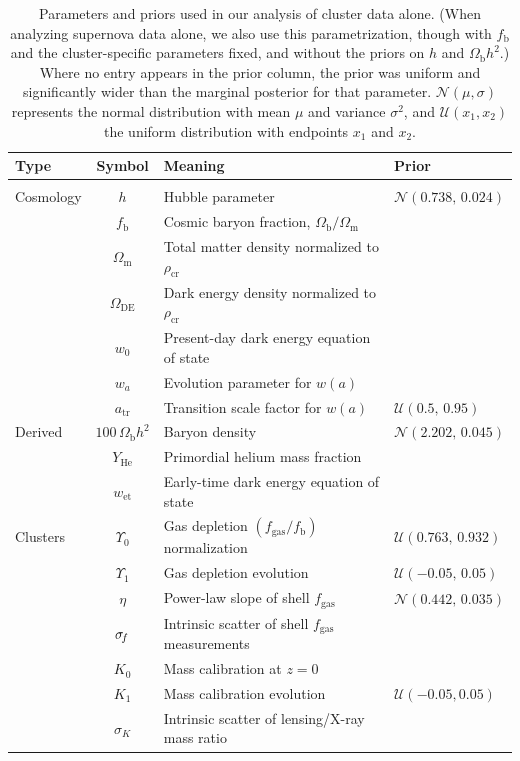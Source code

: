 \documentclass[useAMS,usenatbib,usegraphicx]{mn2e}
\newcommand*{\mysub}[2]{\ensuremath{#1_{\mathrm{#2}}}}
\newcommand*{\Omegam}{\mysub{\Omega}{m}}
\newcommand*{\Omegab}{\mysub{\Omega}{b}}
\newcommand*{\Omegade}{\mysub{\Omega}{DE}}
\newcommand*{\fbar}{\mysub{f}{b}}
\newcommand*{\fgas}{\mysub{f}{gas}}
\newcommand*{\sigmaf}{\ensuremath{\sigma_{\hspace{-0.25ex}f}}}
\newcommand*{\rhocr}{\mysub{\rho}{cr}}
\newcommand*{\YHe}{\mysub{Y}{He}}
\newcommand*{\atr}{\mysub{a}{tr}}
\newcommand*{\wet}{\mysub{w}{et}}
\newcommand*{\dnorm}{\ensuremath{\mathcal{N}}}
\newcommand*{\dunif}{\ensuremath{\mathcal{U}}}
\begin{document}
\begin{table}
  \centering
 \caption{Parameters and priors used in our analysis of cluster data alone. (When analyzing supernova data alone, we also use this parametrization, though with \fbar{} and the cluster-specific parameters fixed, and without the priors on $h$ and $\Omegab h^2$.) Where no entry appears in the prior column, the prior was uniform and significantly wider than the marginal posterior for that parameter. $\mathcal{N}(\mu,\sigma)$ represents the normal distribution with mean $\mu$ and variance $\sigma^2$, and $\mathcal{U}(x_1,x_2)$ the uniform distribution with endpoints $x_1$ and $x_2$.}
  \vspace{1ex}
  \begin{tabular}{lcll}
    \hline
    Type & Symbol & Meaning & Prior \\
    \hline\vspace{-1.5ex}\\
    Cosmology
    & $h$ & Hubble parameter & $\dnorm(0.738, \, 0.024)$ \\
    & $\fbar$ & Cosmic baryon fraction, $\Omegab/\Omegam$ & \\
    & $\Omegam$ & Total matter density normalized to $\rhocr$ & \\
    & $\Omegade$ & Dark energy density normalized to $\rhocr$ & \\
    & $w_0$ & Present-day dark energy equation of state & \\
    & $w_a$ & Evolution parameter for $w(a)$ & \\
    & $\atr$ & Transition scale factor for $w(a)$ & $\dunif(0.5, \, 0.95)$\vspace{1ex}\\
    Derived
    & $100\,\Omegab h^2$ & Baryon density & $\dnorm(2.202, \, 0.045)$ \\
    & $\YHe$ & Primordial helium mass fraction & \\
    & $\wet$ & Early-time dark energy equation of state &\vspace{1ex}\\    
    Clusters
    & $\Upsilon_0$ & Gas depletion $(\fgas/\fbar)$ normalization & $\dunif(0.763, \, 0.932)$ \\
    & $\Upsilon_1$ & Gas depletion evolution & $\dunif(-0.05, \, 0.05)$ \\
    & $\eta$ & Power-law slope of shell $\fgas$ & $\dnorm(0.442, \, 0.035)$ \\
    & $\sigmaf$ & Intrinsic scatter of shell \fgas{} measurements& \\ 
    & $K_0$ & Mass calibration at $z=0$ & \\
    & $K_1$ & Mass calibration evolution & $\dunif(-0.05,0.05)$ \\
    & $\sigma_K$ & Intrinsic scatter of lensing/X-ray mass ratio & \vspace{1ex}\\
   \hline
  \end{tabular}
  \label{tab:paramdef}
\end{table}
\end{document}
